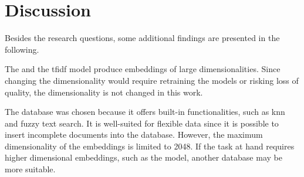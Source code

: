 \section{Discussion}\label{sec:discussion}











Besides the research questions, some additional findings are presented in the following.

The \infersent{} and the \ac{tfidf} model produce embeddings of large dimensionalities.
Since changing the dimensionality would require retraining the models 
or risking loss of quality, the dimensionality is not changed in this work.

The database \databaseName{} was chosen because it offers built-in functionalities,
such as \ac{knn} and fuzzy text search.
It is well-suited for flexible data since it is possible to insert 
incomplete documents into the database.
However, the maximum dimensionality of the embeddings is limited to 2048.
If the task at hand requires higher dimensional embeddings, such as the \infersent{} model, 
another database may be more suitable.